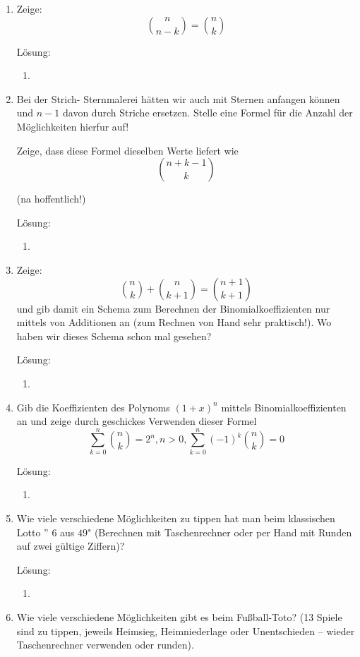 \documentclass[main.tex]{subfiles}
\begin{document}
\begin{enumerate}
	\item Zeige:
	      \[ \binom{n}{n - k} = \binom{n}{k} \]

	      Lösung:
	      \begin{enumerate}
		      \item
	      \end{enumerate}
	\item Bei der Strich- Sternmalerei hätten wir auch mit Sternen anfangen können
	      und \( n - 1 \) davon durch Striche ersetzen. Stelle eine Formel für die Anzahl der Möglichkeiten hierfur auf!

	      Zeige, dass diese Formel dieselben Werte liefert wie
	      \[ \binom{ n + k - 1}{ k} \]

	      (na hoffentlich!)

	      Lösung:
	      \begin{enumerate}
		      \item
	      \end{enumerate}
	\item Zeige:
	      \[ \binom{n}{k} + \binom{n}{ k + 1} = \binom{n + 1}{k + 1} \]
	      und gib damit ein Schema zum Berechnen der Binomialkoeffizienten nur
	      mittels von Additionen an (zum Rechnen von Hand sehr praktisch!). Wo
	      haben wir dieses Schema schon mal gesehen?

	      Lösung:
	      \begin{enumerate}
		      \item
	      \end{enumerate}
	\item  Gib die Koeffizienten des Polynoms \( (1 + x)^n \) mittels Binomialkoeffizienten
	      an und zeige durch geschickes Verwenden dieser Formel
	      \[ \sum_{ k= 0}^{n} \binom{n}{k} = 2^n, n > 0, \sum_{k = 0}^{n} (-1)^k \binom{n}{k} = 0 \]

	      Lösung:
	      \begin{enumerate}
		      \item
	      \end{enumerate}
	\item Wie viele verschiedene Möglichkeiten zu tippen hat man beim klassischen
	      Lotto ” \( 6 \) aus \( 49 \)" (Berechnen mit Taschenrechner oder per Hand mit Runden
	      auf zwei gültige Ziffern)?

	      Lösung:
	      \begin{enumerate}
		      \item
	      \end{enumerate}
	\item Wie viele verschiedene Möglichkeiten gibt es beim Fußball-Toto?
	      (13 Spiele sind zu tippen, jeweils Heimsieg, Heimniederlage oder Unentschieden –
	      wieder Taschenrechner verwenden oder runden).


\end{enumerate}
\end{document}
